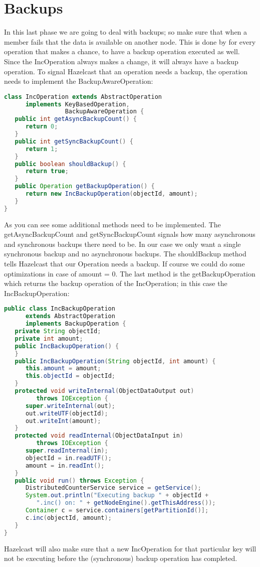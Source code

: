 \section{Backups}
In this last phase we are going to deal with backups; so make sure that when a member fails that the data is available on another node. This is done by for every operation that makes a chance, to have a backup operation executed as well. Since the IncOperation always makes a change, it will always have a backup operation. To signal Hazelcast that an operation needs a backup, the operation needs to implement the BackupAwareOperation:
\begin{lstlisting}[language=java]
class IncOperation extends AbstractOperation 
      implements KeyBasedOperation, 
                 BackupAwareOperation {
   public int getAsyncBackupCount() {
      return 0;
   }
   public int getSyncBackupCount() {
      return 1;
   }
   public boolean shouldBackup() {
      return true;
   }
   public Operation getBackupOperation() {
      return new IncBackupOperation(objectId, amount);
   }
}
\end{lstlisting}
As you can see some additional methods need to be implemented. The getAsyncBackupCount and getSyncBackupCount signals how many asynchronous and synchronous backups there need to be. In our case we only want a single synchronous backup and no asynchronous backups. The shouldBackup method tells Hazelcast that our Operation needs a backup. If course we could do some optimizations in case of amount = 0. The last method is the getBackupOperation which returns the backup operation of the IncOperation; in this case the IncBackupOperation:

\begin{lstlisting}[language=java]
public class IncBackupOperation 
      extends AbstractOperation 
      implements BackupOperation {
   private String objectId;
   private int amount;
   public IncBackupOperation() {
   }
   public IncBackupOperation(String objectId, int amount) {
      this.amount = amount;
      this.objectId = objectId;
   }
   protected void writeInternal(ObjectDataOutput out) 
         throws IOException {
      super.writeInternal(out);
      out.writeUTF(objectId);
      out.writeInt(amount);
   }
   protected void readInternal(ObjectDataInput in) 
         throws IOException {
      super.readInternal(in);
      objectId = in.readUTF();
      amount = in.readInt();
   }
   public void run() throws Exception {
      DistributedCounterService service = getService();
      System.out.println("Executing backup " + objectId + 
         ".inc() on: " + getNodeEngine().getThisAddress());
      Container c = service.containers[getPartitionId()];
      c.inc(objectId, amount);
   }
}
\end{lstlisting}
Hazelcast will also make sure that a new IncOperation for that particular key will not be executing before the (synchronous) backup operation has completed.


